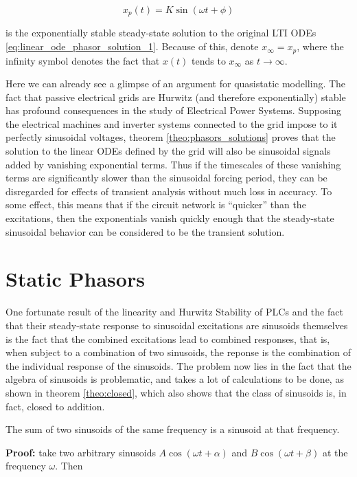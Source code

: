 \begin{equation} x_p(t) = K\sin\left(\omega t + \phi\right) \end{equation}

	\noindent is the exponentially stable steady-state solution to the original LTI ODEs \eqref{eq:linear_ode_phasor_solution_1}. Because of this, denote $x_\infty = x_p$, where the infinity symbol denotes the fact that $x(t)$ tends to $x_\infty$ as $t\to\infty$. 

	Here we can already see a glimpse of an argument for quasistatic modelling. The fact that passive electrical grids are Hurwitz (and therefore exponentially) stable has profound consequences in the study of Electrical Power Systems. Supposing the electrical machines and inverter systems connected to the grid impose to it perfectly sinusoidal voltages, theorem \eqref{theo:phasors_solutions} proves that the solution to the linear ODEs defined by the grid will also be sinusoidal signals added by vanishing exponential terms. Thus if the timescales of these vanishing terms are significantly slower than the sinusoidal forcing period, they can be disregarded for effects of transient analysis without much loss in accuracy. To some effect, this means that if the circuit network is ``quicker'' than the excitations, then the exponentials vanish quickly enough that the steady-state sinusoidal behavior can be considered to be the transient solution.

\section{Static Phasors} %

	One fortunate result of the linearity and Hurwitz Stability of PLCs and the fact that their steady-state response to sinusoidal excitations are sinusoids themselves is the fact that the combined excitations lead to combined responses, that is, when subject to a combination of two sinusoids, the reponse is the combination of the individual response of the sinusoids. The problem now lies in the fact that the algebra of sinusoids is problematic, and takes a lot of calculations to be done, as shown in theorem \ref{theo:closed}, which also shows that the class of sinusoids is, in fact, closed to addition.

\begin{theorem} \label{theo:closed}%
	The sum of two sinusoids of the same frequency is a sinusoid at that frequency.
\end{theorem}
\noindent\textbf{Proof:} take two arbitrary sinusoids $A\cos\left(\omega t + \alpha\right)$ and $B\cos\left(\omega t + \beta\right)$ at the frequency $\omega$. Then

